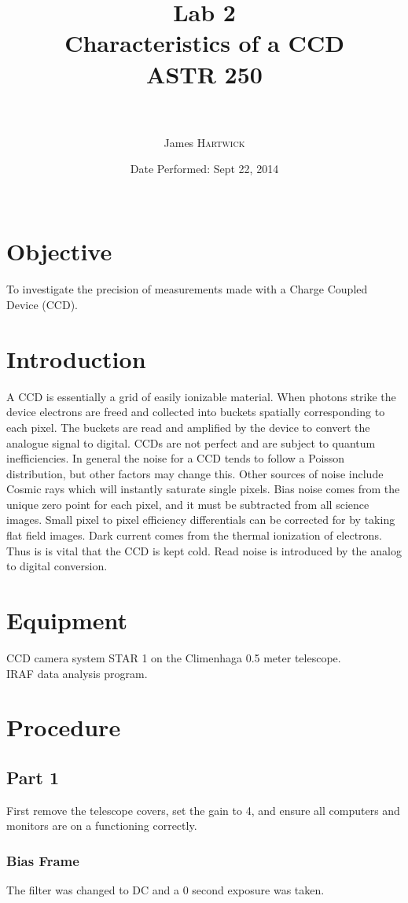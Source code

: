 \documentclass{article}
\title{Lab 2 \\ Characteristics of a CCD \\ ASTR 250\\ \ \\ } %
\author{James \textsc{Hartwick}} %
\date{Date Performed: Sept 22, 2014\\ \ } %
\begin{document}
\maketitle %


\section{Objective}
To investigate the precision of measurements made with a Charge Coupled Device (CCD).
\section{Introduction}
A CCD is essentially a grid of easily ionizable material. When photons strike the device electrons are freed and collected into buckets spatially corresponding to each pixel. The buckets are read and amplified by the device to convert the analogue signal to digital. CCDs are not perfect and are subject to quantum inefficiencies. In general the noise for a CCD tends to follow a Poisson distribution, but other factors may change this. Other sources of noise include Cosmic rays which will instantly saturate single pixels. Bias noise comes from the unique zero point for each pixel, and it must be subtracted from all science images. Small pixel to pixel efficiency differentials can be corrected for by taking flat field images. Dark current comes from the thermal ionization of electrons. Thus is is vital that the CCD is kept cold. Read noise is introduced by the analog to digital conversion.
\section{Equipment}
CCD camera system STAR 1 on the Climenhaga 0.5 meter telescope.\\
IRAF data analysis program.
\section{Procedure}
\subsection{Part 1}
First remove the telescope covers, set the gain to 4, and ensure all computers and monitors are on a functioning correctly.
\subsubsection{Bias Frame}
The filter was changed to DC and a 0 second exposure was taken.
\end{document}
